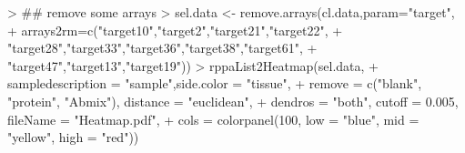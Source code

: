 \documentclass[12pt]{article}
\begin{document}
\begin{Schunk}
\begin{Sinput}
> ## remove some arrays
> sel.data <- remove.arrays(cl.data,param="target",
+             arrays2rm=c("target10","target2","target21","target22",
+             "target28","target33","target36","target38","target61",
+             "target47","target13","target19"))
> rppaList2Heatmap(sel.data,
+       sampledescription = "sample",side.color = "tissue",
+       remove = c("blank", "protein", "Abmix"), distance = "euclidean",
+       dendros = "both", cutoff = 0.005, fileName = "Heatmap.pdf",
+       cols = colorpanel(100, low = "blue", mid = "yellow", high = "red"))
\end{Sinput}
\end{Schunk}



\end{document}
